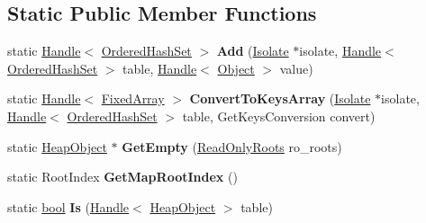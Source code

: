 \subsection*{Static Public Member Functions}
\begin{DoxyCompactItemize}
\item 
\mbox{\label{classv8_1_1internal_1_1OrderedHashSet_aa0fd4ad99dcf8a8b6a7fe1f6f111b584}} 
static \mbox{\hyperlink{classv8_1_1internal_1_1Handle}{Handle}}$<$ \mbox{\hyperlink{classv8_1_1internal_1_1OrderedHashSet}{Ordered\+Hash\+Set}} $>$ {\bfseries Add} (\mbox{\hyperlink{classv8_1_1internal_1_1Isolate}{Isolate}} $\ast$isolate, \mbox{\hyperlink{classv8_1_1internal_1_1Handle}{Handle}}$<$ \mbox{\hyperlink{classv8_1_1internal_1_1OrderedHashSet}{Ordered\+Hash\+Set}} $>$ table, \mbox{\hyperlink{classv8_1_1internal_1_1Handle}{Handle}}$<$ \mbox{\hyperlink{classv8_1_1internal_1_1Object}{Object}} $>$ value)
\item 
\mbox{\label{classv8_1_1internal_1_1OrderedHashSet_a4e34d2a77337c8054b0c4c77b63f8ff5}} 
static \mbox{\hyperlink{classv8_1_1internal_1_1Handle}{Handle}}$<$ \mbox{\hyperlink{classv8_1_1internal_1_1FixedArray}{Fixed\+Array}} $>$ {\bfseries Convert\+To\+Keys\+Array} (\mbox{\hyperlink{classv8_1_1internal_1_1Isolate}{Isolate}} $\ast$isolate, \mbox{\hyperlink{classv8_1_1internal_1_1Handle}{Handle}}$<$ \mbox{\hyperlink{classv8_1_1internal_1_1OrderedHashSet}{Ordered\+Hash\+Set}} $>$ table, Get\+Keys\+Conversion convert)
\item 
\mbox{\label{classv8_1_1internal_1_1OrderedHashSet_ac3fa11723c2f22bda04d7851bc8651d0}} 
static \mbox{\hyperlink{classv8_1_1internal_1_1HeapObject}{Heap\+Object}} $\ast$ {\bfseries Get\+Empty} (\mbox{\hyperlink{classv8_1_1internal_1_1ReadOnlyRoots}{Read\+Only\+Roots}} ro\+\_\+roots)
\item 
\mbox{\label{classv8_1_1internal_1_1OrderedHashSet_a55071066cbd4271eeed2dd92dfe41cf3}} 
static Root\+Index {\bfseries Get\+Map\+Root\+Index} ()
\item 
\mbox{\label{classv8_1_1internal_1_1OrderedHashSet_af15a810f3c1cf421f9775c2450cf4feb}} 
static \mbox{\hyperlink{classbool}{bool}} {\bfseries Is} (\mbox{\hyperlink{classv8_1_1internal_1_1Handle}{Handle}}$<$ \mbox{\hyperlink{classv8_1_1internal_1_1HeapObject}{Heap\+Object}} $>$ table)
\end{DoxyCompactItemize}
